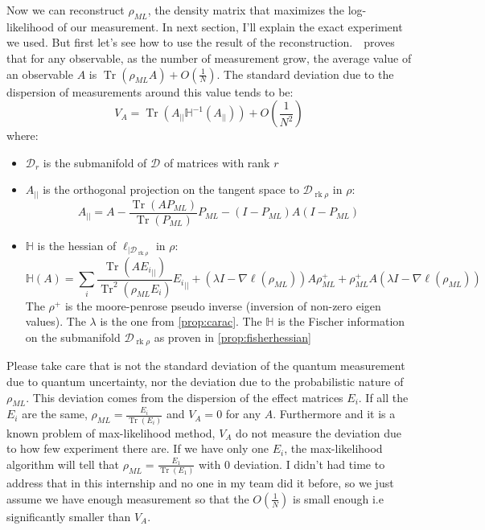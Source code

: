 \documentclass[10pt,a4paper]{report}
\theoremstyle{plain}
\theoremstyle{definition}
\theoremstyle{remark}
\DeclareMathOperator{\Tr}{Tr}
\DeclareMathOperator{\rk}{rk}
\newcommand{\trnorm}[1]{\frac{#1}{\Tr\left({#1}\right)}}
\newcommand{\ml}{_{M\!L}}
\begin{document}
Now we can reconstruct $\rho\ml$, the density matrix that maximizes the
log-likelihood of our measurement. In next section, I'll explain the exact
experiment we used. But first let's see how to use the result of the
reconstruction.~\cite{SPRAL17}~proves that for any observable, as the number of
measurement grow, the average value of an observable $A$ is $\Tr(\rho_{ML}A) +
O(\frac 1 N)$. The standard deviation due to the dispersion of measurements
 around this value tends to be:
\newcommand{\pr}{_{||}}
\newcommand{\inv}{^{-1}}
\begin{equation}\label{eqn:var}
V_A = \Tr(A\pr \mathbb H\inv(A\pr)) +O(\frac 1 {N^2})
\end{equation}
where:
\begin{itemize}
\item $\mathcal{D}_r$ is the submanifold of $\mathcal{D}$ of matrices with rank $r$
\item $A\pr$ is
  the orthogonal projection on the tangent space to $\mathcal{D}_{\rk \rho}$ in
  $\rho$:
  \[A\pr = A - \frac{\Tr(AP\ml)}{\Tr(P\ml)}P\ml - (I-P\ml)A(I-P\ml)\]
\item $\mathbb H$ is the hessian of $\ell_{|\mathcal{D}_{\rk \rho}}$ in $\rho$:
  \[\mathbb{H}(A) = \sum_i \frac{\Tr(A{E_i}\pr)}{\Tr^2(\rho\ml E_i)} {E_i}\pr +
    (\lambda I - \nabla \ell(\rho\ml))A\rho\ml^+ +
    \rho\ml^+A(\lambda I - \nabla \ell(\rho\ml))\]
  The $\rho^+$ is the moore-penrose pseudo inverse (inversion of non-zero eigen
  values). The $\lambda$ is the one from \cref{prop:carac}.
  The $\mathbb H$ is the Fischer information on the submanifold
  $\mathcal{D}_{\rk \rho}$ as proven in \cref{prop:fisherhessian}
\end{itemize}

Please take care that is not the standard deviation of the quantum measurement
due to quantum uncertainty, nor the deviation due to the probabilistic nature of
$\rho\ml$. This deviation comes from the dispersion of the effect matrices
$E_i$. If all the $E_i$ are the same, $\rho\ml = \trnorm{E_i}$ and $V_A = 0$ for
any $A$. Furthermore and it is a known problem of max-likelihood method, $V_A$
do not measure the deviation due to how few experiment there are. If we have
only one $E_i$, the max-likelihood algorithm will tell that $\rho\ml =
\trnorm{E_1}$ with 0 deviation. I didn't had time to address that in this
internship and no one in my team did it before, so we just assume we have
enough measurement so that the $O(\frac1N)$ is small enough i.e significantly
smaller than $V_A$.
\end{document}
